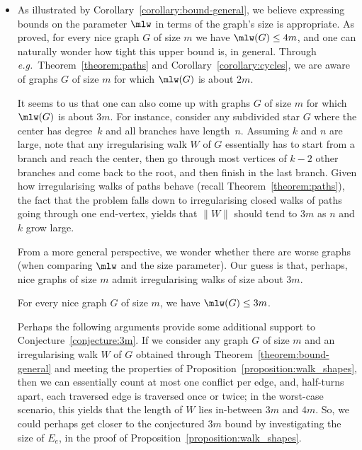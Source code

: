 \documentclass[a4paper,11pt,dvipsnames]{elsarticle}
\begin{document}
\begin{itemize}
    \item As illustrated by Corollary~\ref{corollary:bound-general}, we believe expressing bounds on the parameter $\mlw$ in terms of the graph's size is appropriate. As proved, for every nice graph $G$ of size $m$ we have $\mlw(G) \leq 4m$, and one can naturally wonder how tight this upper bound is, in general. Through \textit{e.g.}~Theorem~\ref{theorem:paths} and Corollary~\ref{corollary:cycles}, we are aware of graphs $G$ of size $m$ for which $\mlw(G)$ is about $2m$. 
    
    It seems to us that one can also come up with graphs $G$ of size $m$ for which $\mlw(G)$ is about $3m$. For instance, consider any subdivided star $G$ where the center has degree~$k$ and all branches have length~$n$. Assuming $k$ and $n$ are large, note that any irregularising walk $W$ of $G$ essentially has to start from a branch and reach the center, then go through most vertices of $k-2$ other branches and come back to the root, and then finish in the last branch. Given how irregularising walks of paths behave (recall Theorem~\ref{theorem:paths}), the fact that the problem falls down to irregularising closed walks of paths going through one end-vertex, yields that $\|W\|$ should tend to $3m$ as $n$ and $k$ grow large.
    
    From a more general perspective, we wonder whether there are worse graphs (when comparing $\mlw$ and the size parameter). Our guess is that, perhaps, nice graphs of size $m$ admit irregularising walks of size about $3m$.%

    \begin{conjecture}\label{conjecture:3m}
    For every nice graph $G$ of size $m$, we have $\mlw(G) \leq 3m$.
    \end{conjecture}

    Perhaps the following arguments provide some additional support to Conjecture~\ref{conjecture:3m}. If we consider any graph $G$ of size $m$ and an irregularising walk $W$ of $G$ obtained through Theorem~\ref{theorem:bound-general} and meeting the properties of Proposition~\ref{proposition:walk_shapes}, then we can essentially count at most one conflict per edge, and, half-turns apart, each traversed edge is traversed once or twice; in the worst-case scenario, this yields that the length of $W$ lies in-between $3m$ and $4m$. So, we could perhaps get closer to the conjectured $3m$ bound by investigating the size of $E_e$, in the proof of Proposition~\ref{proposition:walk_shapes}.
    

\end{itemize}
\end{document}
